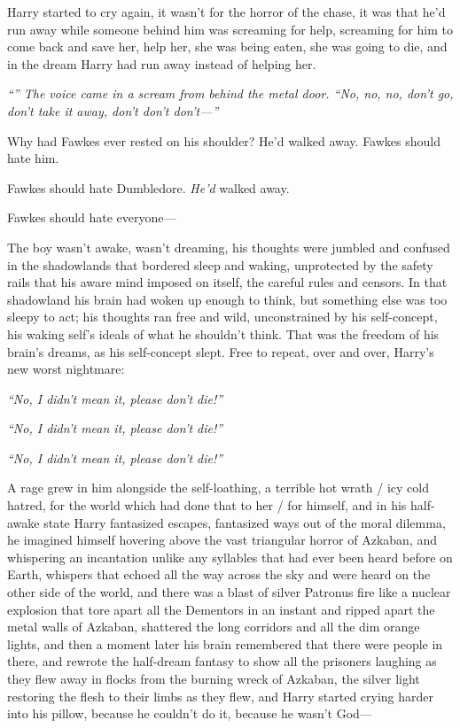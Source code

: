 Harry started to cry again, it wasn’t for the horror of the chase, it was that he’d run away while someone behind him was screaming for help, screaming for him to come back and save her, help her, she was being eaten, she was going to die, and in the dream Harry had run away instead of helping her.

\emph{“” The voice came in a scream from behind the metal door. “No, no, no, don’t go, don’t take it away, don’t don’t don’t—”}

Why had Fawkes ever rested on his shoulder? He’d walked away. Fawkes should hate him.

Fawkes should hate Dumbledore. \emph{He’d} walked away.

Fawkes should hate everyone—

The boy wasn’t awake, wasn’t dreaming, his thoughts were jumbled and confused in the shadowlands that bordered sleep and waking, unprotected by the safety rails that his aware mind imposed on itself, the careful rules and censors. In that shadowland his brain had woken up enough to think, but something else was too sleepy to act; his thoughts ran free and wild, unconstrained by his self-concept, his waking self’s ideals of what he shouldn’t think. That was the freedom of his brain’s dreams, as his self-concept slept. Free to repeat, over and over, Harry’s new worst nightmare:

\emph{“No, I didn’t mean it, please don’t die!”}

\emph{“No, I didn’t mean it, please don’t die!”}

\emph{“No, I didn’t mean it, please don’t die!”}

A rage grew in him alongside the self-loathing, a terrible hot wrath / icy cold hatred, for the world which had done that to her / for himself, and in his half-awake state Harry fantasized escapes, fantasized ways out of the moral dilemma, he imagined himself hovering above the vast triangular horror of Azkaban, and whispering an incantation unlike any syllables that had ever been heard before on Earth, whispers that echoed all the way across the sky and were heard on the other side of the world, and there was a blast of silver Patronus fire like a nuclear explosion that tore apart all the Dementors in an instant and ripped apart the metal walls of Azkaban, shattered the long corridors and all the dim orange lights, and then a moment later his brain remembered that there were people in there, and rewrote the half-dream fantasy to show all the prisoners laughing as they flew away in flocks from the burning wreck of Azkaban, the silver light restoring the flesh to their limbs as they flew, and Harry started crying harder into his pillow, because he couldn’t do it, because he wasn’t God—

